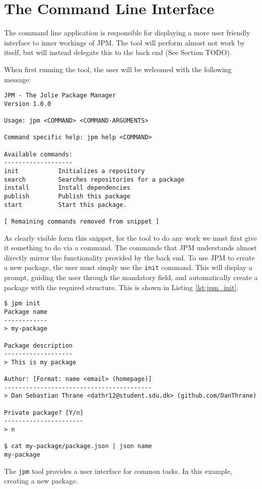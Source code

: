 \section{The Command Line Interface}

The command line application is responsible for displaying a more user friendly
interface to inner workings of JPM. The tool will perform almost not work by
itself, but will instead delegate this to the back end (See Section TODO).

When first running the tool, the user will be welcomed with the following
message:

\begin{verbatim}
JPM - The Jolie Package Manager
Version 1.0.0

Usage: jpm <COMMAND> <COMMAND-ARGUMENTS>

Command specific help: jpm help <COMMAND>

Available commands:
-------------------
init           Initializes a repository
search         Searches repositories for a package
install        Install dependencies
publish        Publish this package
start          Start this package.

[ Remaining commands removed from snippet ]
\end{verbatim}

As clearly visible form this snippet, for the tool to do any work we must first
give it something to do via a command. The commands that JPM understands almost
directly mirror the functionality provided by the back end. To use JPM to
create a new package, the user must simply use the \texttt{init}
command. This will display a prompt, guiding the user through the mandatory
field, and automatically create a package with the required structure. This
is shown in Listing \ref{lst:jpm_init}.

\begin{listing}[H]
\begin{verbatim}
$ jpm init
Package name
------------
> my-package

Package description
-------------------
> This is my package

Author: [Format: name <email> (homepage)]
-----------------------------------------
> Dan Sebastian Thrane <dathr12@student.sdu.dk> (github.com/DanThrane)

Private package? [Y/n]
----------------------
> n

$ cat my-package/package.json | json name
my-package
\end{verbatim}

\caption{The \texttt{jpm} tool provides a user interface for common
    tasks. In this example, creating a new package.}

\label{lst:jpm_init}

\end{listing}


